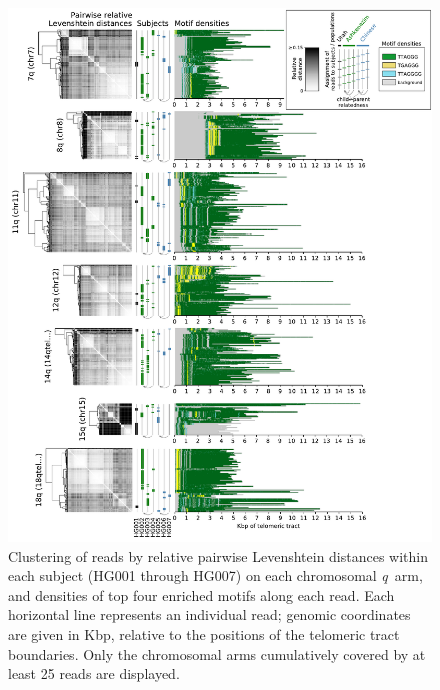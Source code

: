 \documentclass{article}
\begin{document}
                \begin{figure}[h!] \centering %
                \includegraphics[height=.88\textheight,width=\textwidth,keepaspectratio]{../figures/Figure_5.pdf} %
                \caption{ %
                    \small Clustering of reads by relative pairwise Levenshtein distances %
                    within each subject (HG001 through HG007) %
                    on each chromosomal \mbox{\textit{q} arm}, %
                    and densities of top four enriched motifs along each read. %
                    Each horizontal line represents an individual read; %
                    genomic coordinates are given in Kbp, relative to the positions of the telomeric tract boundaries. %
                    Only the chromosomal arms cumulatively covered by at least 25 reads are displayed. %
                } %
                \label{fig:subject_haplotypes} %
                \end{figure} %
\end{document}
